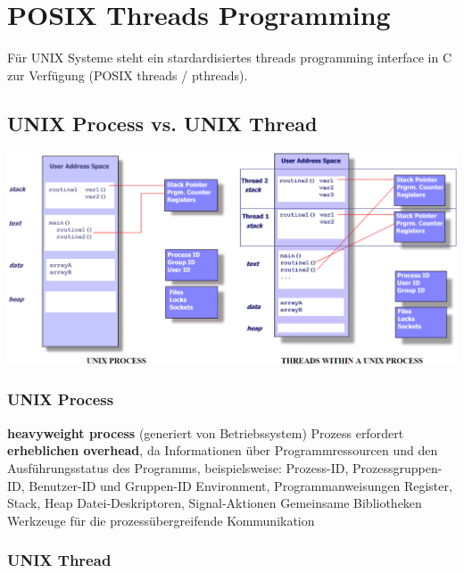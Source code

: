 \section{POSIX Threads Programming}

Für UNIX Systeme steht ein stardardisiertes threads programming interface in C zur Verfügung (POSIX threads / pthreads).


\subsection{UNIX Process vs. UNIX Thread}

\includegraphics[width=\columnwidth]{images/posix_process_threads.png}


\subsubsection{UNIX Process}

\begin{outline}
    \1 \textbf{heavyweight process} (generiert von Betriebssystem)
    \1 Prozess erfordert \textbf{erheblichen overhead}, da Informationen über Programmressourcen und 
        den Ausführungsstatus des Programms, beispielsweise:
        \2 Prozess-ID, Prozessgruppen-ID, Benutzer-ID und Gruppen-ID
        \2 Environment, Programmanweisungen
        \2 Register, Stack, Heap
        \2 Datei-Deskriptoren, Signal-Aktionen
        \2 Gemeinsame Bibliotheken
        \2 Werkzeuge für die prozessübergreifende Kommunikation
\end{outline}


\subsubsection{UNIX Thread}

